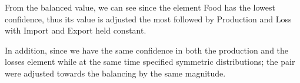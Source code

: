 \documentclass[nojss]{jss}\usepackage[]{graphicx}\usepackage[]{color}
\begin{document}
From the balanced value, we can see since the element Food has the
lowest confidence, thus its value is adjusted the most followed by
Production and Loss with Import and Export held constant.

In addition, since we have the same confidence in both the production
and the losses element while at the same time specified symmetric
distributions; the pair were adjusted towards the balancing by the
same magnitude.

\end{document}
